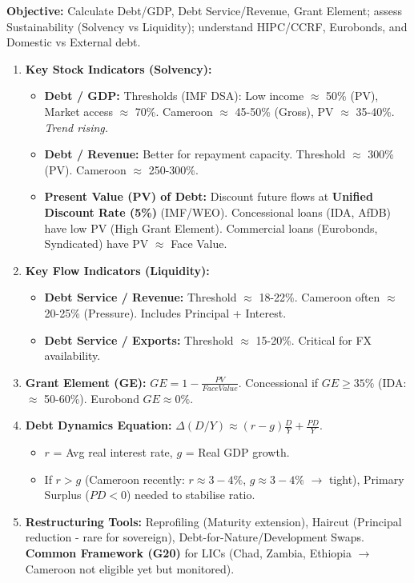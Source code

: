 \documentclass[11pt]{article}
\begin{document}
\begin{methode}
\textbf{Objective:} Calculate Debt/GDP, Debt Service/Revenue, Grant Element; assess Sustainability (Solvency vs Liquidity); understand HIPC/CCRF, Eurobonds, and Domestic vs External debt.
\begin{enumerate}
    \item \textbf{Key Stock Indicators (Solvency):}
    \begin{itemize}
        \item \textbf{Debt / GDP:} Thresholds (IMF DSA): Low income $\approx$ 50\% (PV), Market access $\approx$ 70\%. Cameroon $\approx$ 45-50\% (Gross), PV $\approx$ 35-40\%. \textit{Trend rising.}
        \item \textbf{Debt / Revenue:} Better for repayment capacity. Threshold $\approx$ 300\% (PV). Cameroon $\approx$ 250-300\%.
        \item \textbf{Present Value (PV) of Debt:} Discount future flows at \textbf{Unified Discount Rate (5\%)} (IMF/WEO). Concessional loans (IDA, AfDB) have low PV (High Grant Element). Commercial loans (Eurobonds, Syndicated) have PV $\approx$ Face Value.
    \end{itemize}
    \item \textbf{Key Flow Indicators (Liquidity):}
    \begin{itemize}
        \item \textbf{Debt Service / Revenue:} Threshold $\approx$ 18-22\%. Cameroon often $\approx$ 20-25\% (Pressure). Includes Principal + Interest.
        \item \textbf{Debt Service / Exports:} Threshold $\approx$ 15-20\%. Critical for FX availability.
    \end{itemize}
    \item \textbf{Grant Element (GE):} $GE = 1 - \frac{PV}{Face Value}$. Concessional if $GE \ge 35\%$ (IDA: $\approx$ 50-60\%). Eurobond $GE \approx 0\%$.
    \item \textbf{Debt Dynamics Equation:} $\Delta (D/Y) \approx (r - g) \frac{D}{Y} + \frac{PD}{Y}$. 
    \begin{itemize}
        \item $r$ = Avg real interest rate, $g$ = Real GDP growth.
        \item If $r > g$ (Cameroon recently: $r \approx 3-4\%$, $g \approx 3-4\%$ $\rightarrow$ tight), Primary Surplus ($PD<0$) needed to stabilise ratio.
    \end{itemize}
    \item \textbf{Restructuring Tools:} Reprofiling (Maturity extension), Haircut (Principal reduction - rare for sovereign), Debt-for-Nature/Development Swaps. \textbf{Common Framework (G20)} for LICs (Chad, Zambia, Ethiopia $\rightarrow$ Cameroon not eligible yet but monitored).
\end{enumerate}
\end{methode}
\end{document}
